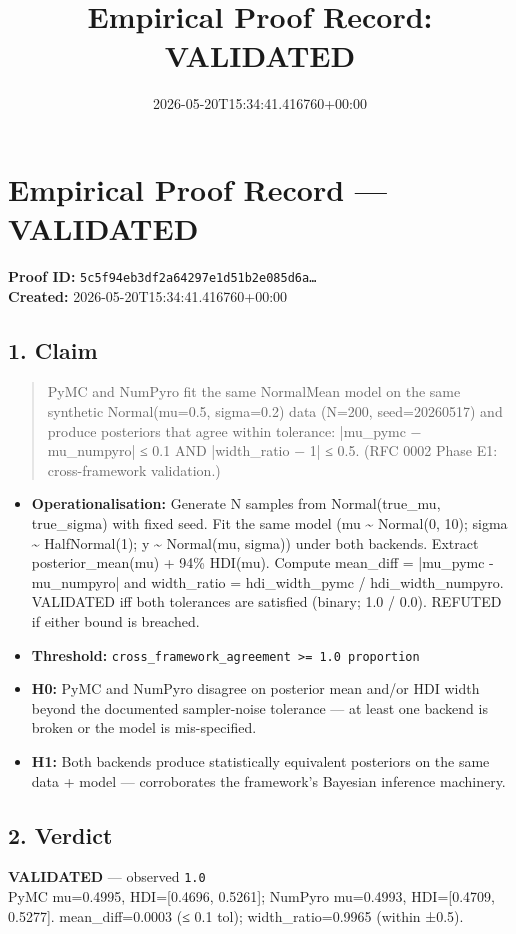 \documentclass{article}
\title{Empirical Proof Record: VALIDATED}
\date{2026-05-20T15:34:41.416760+00:00}
\begin{document}
\maketitle
\section*{Empirical Proof Record --- \textcolor{validated}{\textbf{VALIDATED}}}
\textbf{Proof ID:} \texttt{5c5f94eb3df2a64297e1d51b2e085d6a\dots}\\
\textbf{Created:} 2026-05-20T15:34:41.416760+00:00
\subsection*{1. Claim}
\begin{quote}PyMC and NumPyro fit the same NormalMean model on the same synthetic Normal(mu=0.5, sigma=0.2) data (N=200, seed=20260517) and produce posteriors that agree within tolerance: |mu\_pymc − mu\_numpyro| ≤ 0.1 AND |width\_ratio − 1| ≤ 0.5. (RFC 0002 Phase E1: cross-framework validation.)\end{quote}
\begin{itemize}
\item \textbf{Operationalisation:} Generate N samples from Normal(true\_mu, true\_sigma) with fixed seed. Fit the same model (mu \textasciitilde{} Normal(0, 10); sigma \textasciitilde{} HalfNormal(1); y \textasciitilde{} Normal(mu, sigma)) under both backends. Extract posterior\_mean(mu) + 94\% HDI(mu). Compute mean\_diff = |mu\_pymc - mu\_numpyro| and width\_ratio = hdi\_width\_pymc / hdi\_width\_numpyro. VALIDATED iff both tolerances are satisfied (binary; 1.0 / 0.0). REFUTED if either bound is breached.
\item \textbf{Threshold:} \texttt{cross\_framework\_agreement >= 1.0 proportion}
\item \textbf{H0:} PyMC and NumPyro disagree on posterior mean and/or HDI width beyond the documented sampler-noise tolerance — at least one backend is broken or the model is mis-specified.
\item \textbf{H1:} Both backends produce statistically equivalent posteriors on the same data + model — corroborates the framework's Bayesian inference machinery.
\end{itemize}
\subsection*{2. Verdict}
\textcolor{validated}{\textbf{VALIDATED}} --- observed \texttt{1.0}\\
PyMC mu=0.4995, HDI=[0.4696, 0.5261]; NumPyro mu=0.4993, HDI=[0.4709, 0.5277]. mean\_diff=0.0003 (≤ 0.1 tol); width\_ratio=0.9965 (within ±0.5).
\end{document}

